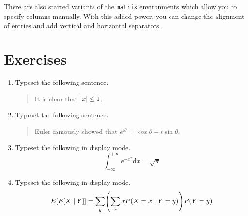 \documentclass{article}
\newcommand*{\code}[1]{\texttt{#1}}
\begin{document}
There are also starred variants of the \code{matrix} environments which allow you to specify columns manually.
With this added power, you can change the alignment of entries and add vertical and horizontal separators.

\section{Exercises}
\begin{enumerate}
\item
  Typeset the following sentence.
  \begin{quote}
    It is clear that $\lvert x\rvert \leq 1$.
  \end{quote}

\item
  Typeset the following sentence.
  \begin{quote}
    Euler famously showed that $e^{i \theta} = \cos \theta + i \sin \theta$.
  \end{quote}

\item
  Typeset the following in display mode.
  \begin{equation*}
    \int_{-\infty}^{+\infty} e^{-x^{2}} \mathrm{d}x = \sqrt{\pi}
  \end{equation*}

\item
  Typeset the following in display mode.
  \begin{equation*}
    E \sbrac{E \sbrac{X \mid Y}} =
    \sum_{y} \pbrac*{ \sum_{x} x P \pbrac*{ X = x \mid Y = y } } P \pbrac*{ Y = y }
  \end{equation*}
\end{enumerate}
\end{document}
